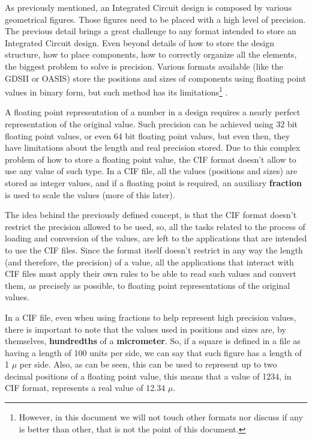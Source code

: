 \documentclass[11pt,twoside,openany,x11names,svgnames]{memoir}
\begin{document}
As previously mentioned, an Integrated Circuit design is composed by various geometrical figures. Those figures need to be placed with a high level of precision. The previous detail brings a great challenge to any format intended to store an Integrated Circuit design. Even beyond details of how to store the design structure, how to place components, how to correctly organize all the elements, the biggest problem to solve is precision. Various formats available (like the GDSII or OASIS) store the positions and sizes of components using floating point values in binary form, but such method has its limitations\footnote{However, in this document we will not touch other formats nor discuss if any is better than other, that is not the point of this document.} .

A floating point representation of a number in a design requires a nearly perfect representation of the original value. Such precision can be achieved using 32 bit floating point values, or even 64 bit floating point values, but even then, they have limitations about the length and real precision stored. Due to this complex problem of how to store a floating point value, the CIF format doesn't allow to use any value of such type. In a CIF file, all the values (positions and sizes) are stored as integer values, and if a floating point is required, an auxiliary \textbf{fraction} is used to scale the values (more of this later).

The idea behind the previously defined concept, is that the CIF format doesn't restrict the precision allowed to be used, so, all the tasks related to the process of loading and conversion of the values, are left to the applications that are intended to use the CIF files. Since the format itself doesn't restrict in any way the length (and therefore, the precision) of a value, all the applications that interact with CIF files must apply their own rules to be able to read such values and convert them, as precisely as possible, to floating point representations of the original values.

In a CIF file, even when using fractions to help represent high precision values, there is important to note that the values used in positions and sizes are, by themselves, \textbf{hundredths} of a \textbf{micrometer}. So, if a square is defined in a file as having a length of 100 units per side, we can say that such figure has a length of 1 $\mu$ per side. Also, as can be seen, this can be used to represent up to two decimal positions of a floating point value, this means that a value of 1234, in CIF format, represents a real value of 12.34 $\mu$.
\end{document}
